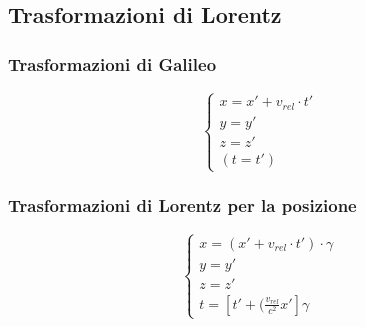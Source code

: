     \subsection{Trasformazioni di Lorentz}
	\subsubsection{Trasformazioni di Galileo}
	\begin{equation*}
	\begin{cases}
	x=x'+v_{rel}\cdot t'\\
	y=y'\\
	z=z'\\
	(t=t')
	\end{cases}
	\end{equation*}
	\subsubsection{Trasformazioni di Lorentz per la posizione}
	\begin{equation}
	\begin{cases}
	x=(x'+v_{rel}\cdot t')\cdot\gamma\\
	y=y'\\
	z=z'\\
	t=[t'+(\frac{v_{rel}}{c^2}x']\gamma
	\end{cases}
	\end{equation}
